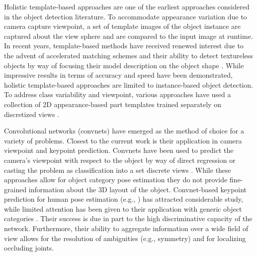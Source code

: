 \documentclass[letterpaper, 10 pt, conference]{ieeeconf}
\begin{document}
Holistic template-based approaches are one of the earliest approaches considered in the object detection literature. To accommodate appearance variation due to camera capture viewpoint, a set of template images of the object instance are captured about the view sphere and are compared to the input image at runtime. In recent years, template-based methods have received renewed interest due to the advent of accelerated matching schemes and their ability to detect textureless objects by way of focusing their model description on the object shape \cite{muja2011,Hinterstoisser2012,rios2013,xie2013,cao2016}. While impressive results in terms of accuracy and speed have been demonstrated, holistic template-based approaches are limited to instance-based object detection. To address class variability and viewpoint, various approaches have used a collection of 2D appearance-based part templates trained separately on discretized views \cite{gu2010,fidler2012,pepik2012,xiang2014,zhu2014single}.  

Convolutional networks (convnets) \cite{lecun1989,krizhevsky2012} have emerged as the method of choice for a variety of problems.  Closest to the current work is their application in camera viewpoint and keypoint prediction. Convnets have been used to predict the camera's viewpoint with respect to the object by way of direct regression or casting the problem as classification into a set discrete views \cite{massa2014,tulsiani2015vk,su2015}.  While these approaches allow for object category pose estimation they do not provide fine-grained information about the 3D layout of the object. Convnet-based keypoint prediction for human pose estimation (e.g., \cite{toshev2014,zhou2015sparseness,newell2016stacked,wei2016cpm}) has attracted considerable study, while limited attention has been given to their application with generic object categories \cite{long2014,tulsiani2015vk}. Their success is due in part to the high discriminative capacity of the network.  Furthermore, their ability to aggregate information over a wide field of view allows for the resolution of ambiguities (e.g., symmetry) and for localizing occluding joints.
\end{document}
